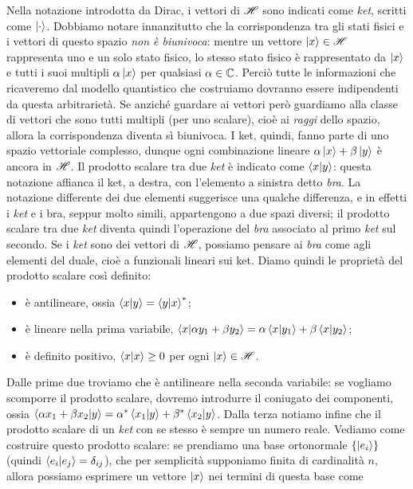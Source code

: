 Nella notazione introdotta da Dirac, i vettori di $\mathscr H$ sono indicati come \emph{ket}, scritti come $\left|{\cdot}\right\rangle$.
Dobbiamo notare innanzitutto che la corrispondenza tra gli stati fisici e i vettori di questo spazio \emph{non è biunivoca}: mentre un vettore $\left|{x}\right\rangle\in\mathscr H$ rappresenta uno e un solo stato fisico, lo stesso stato fisico è rappresentato da $\left|{x}\right\rangle$ e tutti i suoi multipli $\alpha\left|{x}\right\rangle$ per qualsiasi $\alpha\in\mathbb{C}$.
Perciò tutte le informazioni che ricaveremo dal modello quantistico che costruiamo dovranno essere indipendenti da questa arbitrarietà.
Se anzich\'e guardare ai vettori però guardiamo alla classe di vettori che sono tutti multipli (per uno scalare), cioè ai \emph{raggi} dello spazio, allora la corrispondenza diventa s\`i biunivoca.
I ket, quindi, fanno parte di uno spazio vettoriale complesso, dunque ogni combinazione lineare $\alpha\left|{x}\right\rangle+\beta\left|{y}\right\rangle$ è ancora in $\mathscr H$.
Il prodotto scalare tra due \emph{ket} è indicato come $\left\langle{x}\middle|{y}\right\rangle$: questa notazione affianca il ket, a destra, con l'elemento a sinistra detto \emph{bra}.
La notazione differente dei due elementi suggerisce una qualche differenza, e in effetti i \emph{ket} e i bra, seppur molto simili, appartengono a due spazi diversi; il prodotto scalare tra due \emph{ket} diventa quindi l'operazione del \emph{bra} associato al primo \emph{ket} sul secondo.
Se i \emph{ket} sono dei vettori di $\mathscr H$, possiamo pensare ai \emph{bra} come agli elementi del duale, cioè a funzionali lineari sui ket.
Diamo quindi le proprietà del prodotto scalare cos\`i definito:
\begin{itemize}
	\item è antilineare, ossia $\left\langle{x}\middle|{y}\right\rangle=\left\langle{y}\middle|{x}\right\rangle^*$;
	\item è lineare nella prima variabile, $\left\langle{x}\middle|{\alpha y_1+\beta y_2}\right\rangle=\alpha\left\langle{x}\middle|{y_1}\right\rangle+\beta\left\langle{x}\middle|{y_2}\right\rangle$;
	\item è definito positivo, $\left\langle{x}\middle|{x}\right\rangle\geq 0$ per ogni $\left|{x}\right\rangle\in\mathscr H$.
\end{itemize}
Dalle prime due troviamo che è antilineare nella seconda variabile: se vogliamo scomporre il prodotto scalare, dovremo introdurre il coniugato dei componenti, ossia $\left\langle{\alpha x_1+\beta x_2}\middle|{y}\right\rangle=\alpha^*\left\langle{x_1}\middle|{y}\right\rangle+\beta^*\left\langle{x_2}\middle|{y}\right\rangle$.
Dalla terza notiamo infine che il prodotto scalare di un \emph{ket} con se stesso è sempre un numero reale.
Vediamo come costruire questo prodotto scalare: se prendiamo una base ortonormale $\{\left|{e_i}\right\rangle\}$ (quindi $\left\langle{e_i}\middle|{e_j}\right\rangle=\delta_{ij}$), che per semplicità supponiamo finita di cardinalità $n$, allora possiamo esprimere un vettore $\left|{x}\right\rangle$ nei termini di questa base come
